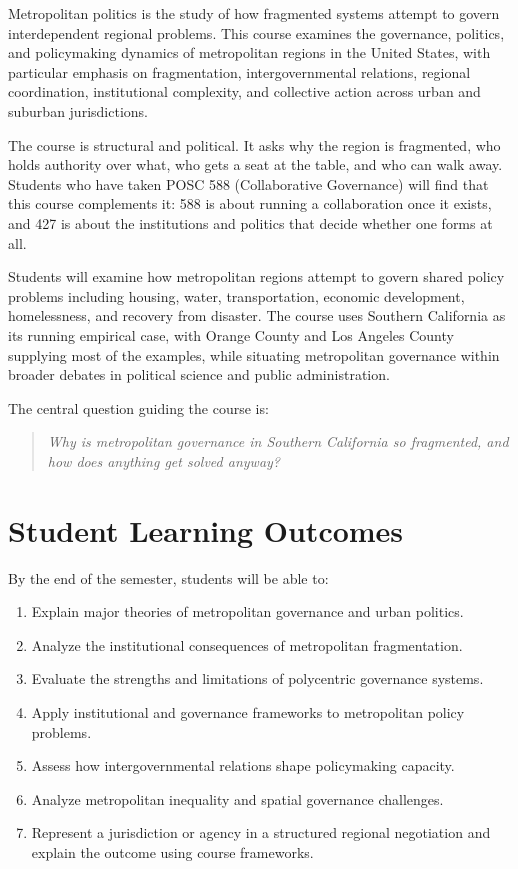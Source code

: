 \documentclass[12pt]{article}
\begin{document}
{\setlength{\parindent}{0pt}\setlength{\parskip}{0.6\baselineskip}%
Metropolitan politics is the study of how fragmented systems attempt to govern interdependent regional problems. This course examines the governance, politics, and policymaking dynamics of metropolitan regions in the United States, with particular emphasis on fragmentation, intergovernmental relations, regional coordination, institutional complexity, and collective action across urban and suburban jurisdictions.

The course is structural and political. It asks why the region is fragmented, who holds authority over what, who gets a seat at the table, and who can walk away. Students who have taken POSC 588 (Collaborative Governance) will find that this course complements it: 588 is about running a collaboration once it exists, and 427 is about the institutions and politics that decide whether one forms at all.

Students will examine how metropolitan regions attempt to govern shared policy problems including housing, water, transportation, economic development, homelessness, and recovery from disaster. The course uses Southern California as its running empirical case, with Orange County and Los Angeles County supplying most of the examples, while situating metropolitan governance within broader debates in political science and public administration.

The central question guiding the course is:

\begin{quote}
\textit{Why is metropolitan governance in Southern California so fragmented, and how does anything get solved anyway?}
\end{quote}
}

\section*{Student Learning Outcomes}

{\setlength{\parindent}{0pt}\setlength{\parskip}{0.6\baselineskip}%
By the end of the semester, students will be able to:

\begin{enumerate}
    \item Explain major theories of metropolitan governance and urban politics.
    \item Analyze the institutional consequences of metropolitan fragmentation.
    \item Evaluate the strengths and limitations of polycentric governance systems.
    \item Apply institutional and governance frameworks to metropolitan policy problems.
    \item Assess how intergovernmental relations shape policymaking capacity.
    \item Analyze metropolitan inequality and spatial governance challenges.
    \item Represent a jurisdiction or agency in a structured regional negotiation and explain the outcome using course frameworks.
\end{enumerate}
}
\end{document}

